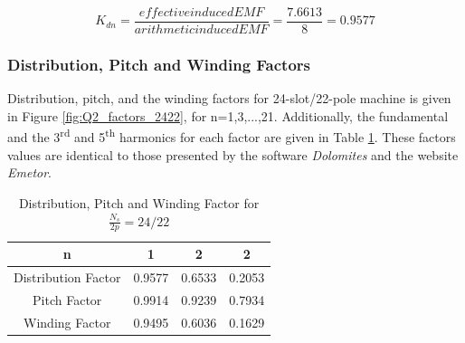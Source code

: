 \documentclass[a4paper, 11pt]{article}
\begin{document}
\begin{equation}
K_{dn} = \frac{effective induced EMF}{arithmetic induced EMF}=\frac{7.6613}{8}=0.9577
\label{eq:distribution_factor_phasor}
\end{equation}


\subsubsection{Distribution, Pitch and Winding Factors}

Distribution, pitch, and the winding factors for 24-slot/22-pole machine is given in Figure \ref{fig:Q2_factors_2422}, for n=1,3,...,21. Additionally, the fundamental and the 3\textsuperscript{rd} and 5\textsuperscript{th} harmonics for each factor are given in Table \ref{tab:Q2_factors_2422}. These factors values are identical to those presented by the software \textit{Dolomites} and the website \textit{Emetor}.

\begin{table}[h!]
\centering
	\begin{tabular}{|c| c c c|} 
		\hline
		n & 1 & 2 & 2 \\ [0.5ex] 
		\hline
		Distribution Factor & 0.9577 & 0.6533 & 0.2053 \\ 
		\hline
		Pitch Factor & 0.9914 & 0.9239 & 0.7934 \\
		\hline
		Winding Factor & 0.9495 & 0.6036 & 0.1629 \\
		\hline
	\end{tabular}
	\caption{Distribution, Pitch and Winding Factor for $\frac{N_s}{2p}=24/22$}
	\label{tab:Q2_factors_2422}
\end{table}
\end{document}
